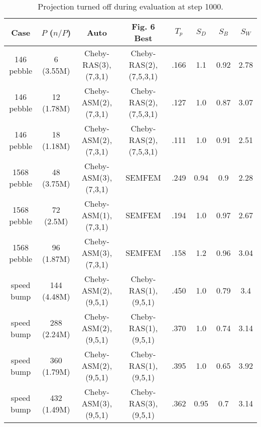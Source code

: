 \begin{table*} \footnotesize
\centering
\begin{subtable}{\textwidth}\centering
\begin{tabular}{||c|| c| c| c| c| c| c| c||}
  \hline
  Case & $P$ ($n/P$) & Auto & Fig. 6 Best & $T_p$ & $S_D$ & $S_B$ & $S_W$\\
  \hline
  \hline
  146 pebble  & 6   (3.55M) & Cheby-RAS(3),(7,3,1)  & Cheby-RAS(2),(7,5,3,1) & .166 &  1.1  & 0.92 & 2.78\\
  146 pebble  & 12  (1.78M) & Cheby-ASM(2),(7,3,1)  & Cheby-RAS(2),(7,5,3,1) & .127 &  1.0  & 0.87 & 3.07\\
  146 pebble  & 18  (1.18M) & Cheby-ASM(2),(7,3,1)  & Cheby-RAS(2),(7,5,3,1) & .111 &  1.0  & 0.91 & 2.51\\
  \hline
  1568 pebble & 48  (3.75M) & Cheby-ASM(3),(7,3,1)  & SEMFEM                & .249 &  0.94 & 0.9  & 2.28\\
  1568 pebble & 72  (2.5M)  & Cheby-ASM(1),(7,3,1)  & SEMFEM                & .194 &  1.0  & 0.97 & 2.67\\
  1568 pebble & 96  (1.87M) & Cheby-ASM(3),(7,3,1)  & SEMFEM                & .158 &  1.2  & 0.96 & 3.04\\
  \hline
  speed bump  & 144 (4.48M) & Cheby-ASM(2),(9,5,1)  & Cheby-RAS(1),(9,5,1)   & .450 &  1.0  & 0.79 & 3.4\\
  speed bump  & 288 (2.24M) & Cheby-ASM(2),(9,5,1)  & Cheby-RAS(1),(9,5,1)   & .370 &  1.0  & 0.74 & 3.14\\
  speed bump  & 360 (1.79M) & Cheby-ASM(2),(9,5,1)  & Cheby-RAS(1),(9,5,1)   & .395 &  1.0  & 0.65 & 3.92\\
  speed bump  & 432 (1.49M) & Cheby-ASM(3),(9,5,1)  & Cheby-RAS(3),(9,5,1)   & .362 &  0.95 & 0.7  & 3.14\\
\hline
\end{tabular}
\caption{\small Projection turned off during evaluation at step 1000.\label{table:auto-tune-no-proj}}
\end{subtable}


\end{table*}

